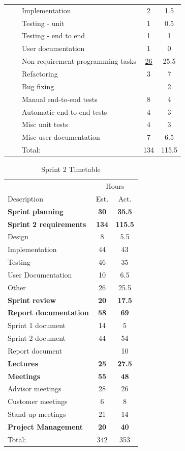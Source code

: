 \begin{table}[!htb]
\begin{tabularx}{\textwidth}{l l X c c}
	   &  & Implementation & 2 & 1.5 \\
	   &  & Testing - unit & 1 & 0.5 \\
	   &  & Testing - end to end & 1 & 1 \\
	   &  & User documentation & 1 & 0 \\
	\addlinespace
	14 &  & Non-requirement programming tasks & \underline{ 26 } & 25.5 \\
	   &  & Refactoring & 3 & 7 \\
	   &  & Bug fixing & & 2 \\
	   &  & Manual end-to-end tests & 8 & 4 \\
	   &  & Automatic end-to-end tests & 4 & 3 \\
	   &  & Misc unit tests & 4 & 3 \\
	   &  & Misc user documentation & 7 & 6.5 \\
	\midrule
	& & Total: & 134 & 115.5 \\
	\bottomrule
\end{tabularx}
\end{table}


\begin{table}[!htb] \small \center
\caption{Sprint 2 Timetable\label{tab:sprint2time}}
\begin{tabularx}{\textwidth}{X c c}
	\toprule
	& \multicolumn{2}{c}{Hours} \\
	\cmidrule(r){2-3}
	Description & Est. & Act. \\
	\midrule
	\textbf{Sprint planning} & \textbf{30} & \textbf{35.5} \\
	\addlinespace
	\textbf{Sprint 2 requirements} & \textbf{134} & \textbf{115.5} \\
	Design & 8 & 5.5 \\
	Implementation & 44 & 43 \\
	Testing & 46 & 35 \\
	User Documentation & 10 & 6.5 \\
	Other & 26 & 25.5 \\
	\addlinespace
	\textbf{Sprint review} & \textbf{20} & \textbf{17.5} \\
	\addlinespace
	\textbf{Report documentation} & \textbf{58} & \textbf{69} \\
	Sprint 1 document & 14 & 5 \\
	Sprint 2 document & 44 & 54 \\
	Report document & & 10 \\
	\addlinespace
	\textbf{Lectures} & \textbf{25} & \textbf{27.5} \\
	\addlinespace
	\textbf{Meetings} & \textbf{55} & \textbf{48} \\
	Advisor meetings & 28 & 26 \\
	Customer meetings & 6 & 8 \\
	Stand-up meetings & 21 & 14 \\
	\addlinespace
	\textbf{Project Management} & \textbf{20} & \textbf{40} \\
	\midrule
	Total: & 342 & 353 \\
	\bottomrule
\end{tabularx}
\end{table}


